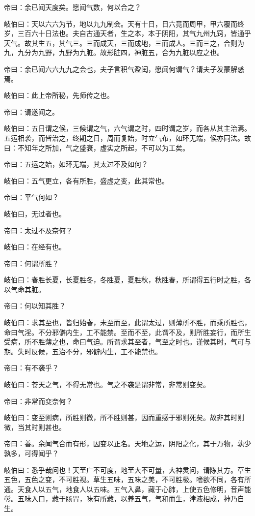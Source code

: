 \documentclass{article}%
\begin{document}
帝曰：余已闻天度矣。愿闻气数，何以合之？

岐伯曰：天以六六为节，地以九九制会。天有十日，日六竟而周甲，甲六覆而终岁，三百六十日法也。夫自古通天者，生之本，本于阴阳，其气九州九窍，皆通乎天气。故其生五，其气三。三而成天，三而成地，三而成人。三而三之，合则为九，九分为九野，九野为九脏。故形脏四，神脏五，合为九脏以应之也。

帝曰：余已闻六六九九之会也，夫子言积气盈闰，愿闻何谓气？请夫子发蒙解惑焉。

岐伯曰：此上帝所秘，先师传之也。

帝曰：请遂闻之。

岐伯曰：五日谓之候，三候谓之气，六气谓之时，四时谓之岁，而各从其主治焉。五运相袭，而皆治之，终期之日，周而复始，时立气布，如环无端，候亦同法。故曰：不知年之所加，气之盛衰，虚实之所起，不可以为工矣。

帝曰：五运之始，如环无端，其太过不及如何？

岐伯曰：五气更立，各有所胜，盛虚之变，此其常也。

帝曰：平气何如？

岐伯曰，无过者也。

帝曰：太过不及奈何？

岐伯曰：在经有也。

帝曰：何谓所胜？

岐伯曰：春胜长夏，长夏胜冬，冬胜夏，夏胜秋，秋胜春，所谓得五行时之胜，各以气命其脏。

帝曰：何以知其胜？

岐伯曰：求其至也，皆归始春，未至而至，此谓太过，则薄所不胜，而乘所胜也，命曰气淫。不分邪僻内生，工不能禁。至而不至，此谓不及，则所胜妄行，而所生受病，所不胜薄之也，命曰气迫。所谓求其至者，气至之时也。谨候其时，气可与期。失时反候，五治不分，邪僻内生，工不能禁也。

帝曰：有不袭乎？

岐伯曰：苍天之气，不得无常也。气之不袭是谓非常，非常则变矣。

帝曰：非常而变奈何？

岐伯曰：变至则病，所胜则微，所不胜则甚，因而重感于邪则死矣。故非其时则微，当其时则甚也。

帝曰：善。余闻气合而有形，因变以正名。天地之运，阴阳之化，其于万物，孰少孰多，可得闻乎？

岐伯曰：悉乎哉问也！天至广不可度，地至大不可量，大神灵问，请陈其方。草生五色，五色之变，不可胜视。草生五味，五味之美，不可胜极。嗜欲不同，各有所通。天食人以五气，地食人以五味。五气入鼻，藏于心肺，上使五色修明，音声能彰。五味入口，藏于肠胃，味有所藏，以养五气，气和而生，津液相成，神乃自生。
\end{document}
